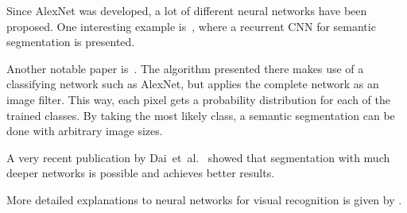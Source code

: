 Since AlexNet was developed, a lot of different neural networks have been
proposed. One interesting example is~\cite{pinheiro2013recurrent}, where
a recurrent \gls{CNN} for semantic segmentation is presented.

Another notable paper is~\cite{long2014fully}. The algorithm presented there
makes use of a classifying network such as AlexNet, but applies the complete
network as an image filter. This way, each pixel gets a probability
distribution for each of the trained classes. By taking the most likely class,
a semantic segmentation can be done with arbitrary image sizes.

A very recent publication by Dai~et~al.~\cite{dai2015instance} showed that
segmentation with much deeper networks is possible and achieves better results.

More detailed explanations to neural networks for visual recognition is given
by \cite{CS231n}.

